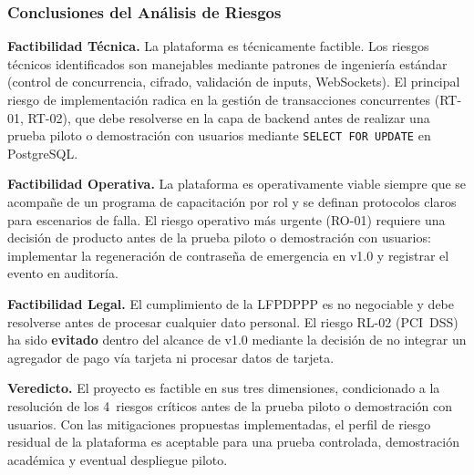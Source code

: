 \subsubsection{Conclusiones del Análisis de Riesgos}

\noindent\textbf{Factibilidad T\'ecnica.}
La plataforma es t\'ecnicamente factible. Los riesgos t\'ecnicos identificados son manejables
mediante patrones de ingenier\'ia est\'andar (control de concurrencia, cifrado, validaci\'on
de inputs, WebSockets). El principal riesgo de implementaci\'on radica en la gesti\'on de
transacciones concurrentes (RT-01, RT-02), que debe resolverse en la capa de backend antes
de realizar una prueba piloto o demostración con usuarios mediante \texttt{SELECT FOR UPDATE} en PostgreSQL.

\noindent\textbf{Factibilidad Operativa.}
La plataforma es operativamente viable siempre que se acompa\~ne de un programa de
capacitaci\'on por rol y se definan protocolos claros para escenarios de falla. El riesgo
operativo m\'as urgente (RO-01) requiere una decisi\'on de producto antes de la
prueba piloto o demostración con usuarios:
implementar la regeneraci\'on de contrase\~na de emergencia en v1.0 y registrar el evento
en auditor\'ia.

\noindent\textbf{Factibilidad Legal.}
El cumplimiento de la LFPDPPP es no negociable y debe resolverse antes de procesar
cualquier dato personal. El riesgo RL-02 (PCI~DSS) ha sido \textbf{evitado} dentro del alcance de v1.0
mediante la decisi\'on de no integrar un agregador de pago v\'ia tarjeta ni procesar datos
de tarjeta.

\noindent\textbf{Veredicto.}
El proyecto es factible en sus tres dimensiones, condicionado a la resoluci\'on de los
4~riesgos cr\'iticos antes de la prueba piloto o demostración con usuarios. Con las mitigaciones propuestas implementadas,
el perfil de riesgo residual de la plataforma es aceptable para una prueba controlada,
demostraci\'on acad\'emica y eventual despliegue piloto.

\newpage

